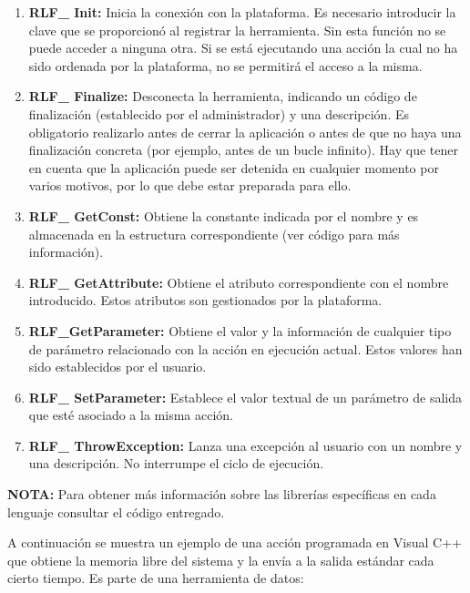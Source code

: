\begin{enumerate}
\item \textbf{RLF\_ Init:} Inicia la conexión con la plataforma. Es 
necesario introducir la clave que se proporcionó al registrar la 
herramienta. Sin esta función no se puede acceder a ninguna otra. Si 
se está ejecutando una acción la cual no ha sido ordenada por la 
plataforma, no se permitirá el acceso a la misma.
\item \textbf{RLF\_ Finalize:} Desconecta la herramienta, indicando un 
código de finalización (establecido por el administrador) y una 
descripción. Es obligatorio realizarlo antes de cerrar la aplicación 
o antes de que no haya una finalización concreta (por ejemplo, antes 
de un bucle infinito). Hay que tener en cuenta que la aplicación puede 
ser detenida en cualquier momento por varios motivos, por lo que debe 
estar preparada para ello.
\item \textbf{RLF\_ GetConst:} Obtiene la constante indicada por el nombre y 
es almacenada en la estructura correspondiente (ver código para más 
información).
\item \textbf{RLF\_ GetAttribute:} Obtiene el atributo correspondiente con el 
nombre introducido. Estos atributos son gestionados por la plataforma.
\item \textbf{RLF\_GetParameter:} Obtiene el valor y la información de 
cualquier tipo de parámetro relacionado con la acción en ejecución 
actual. Estos valores han sido establecidos por el usuario.
\item \textbf{RLF\_ SetParameter:} Establece el valor textual de un parámetro 
de salida que esté asociado a la misma acción.
\item \textbf{RLF\_ ThrowException:} Lanza una excepción al usuario con un 
nombre y una descripción. No interrumpe el ciclo de ejecución.
\end{enumerate}

\textbf{NOTA:} Para obtener más información sobre las librerías 
específicas en cada lenguaje consultar el código entregado.

A continuación se muestra un ejemplo de una acción programada en 
Visual C++ que obtiene la memoria libre del sistema y la envía a la 
salida estándar cada cierto tiempo. Es parte de una herramienta de 
datos:

